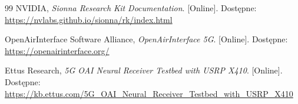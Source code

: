 \documentclass[12pt, a4paper]{article}
\begin{document}
\begin{thebibliography}{99}
NVIDIA, \textit{Sionna Research Kit Documentation}. [Online]. Dostępne: \url{https://nvlabs.github.io/sionna/rk/index.html}

OpenAirInterface Software Alliance, \textit{OpenAirInterface 5G}. [Online]. Dostępne: \url{https://openairinterface.org/}

Ettus Research, \textit{5G OAI Neural Receiver Testbed with USRP X410}. [Online]. Dostępne: \url{https://kb.ettus.com/5G_OAI_Neural_Receiver_Testbed_with_USRP_X410}

\end{thebibliography}
\end{document}
